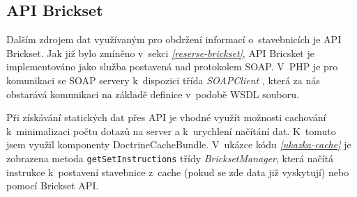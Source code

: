 
\subsection{API Brickset}
Dalším zdrojem dat využívaným pro obdržení informací o~stavebnicích je API Brickset. Jak již bylo zmíněno v~sekci \emph{\ref{reserse-brickset}}, API Bricsket je implementováno jako služba postavená nad protokolem \gls{SOAP}. V~PHP je pro komunikaci se SOAP servery k~dispozici třída \textit{SOAPClient} \autocite{soapclient}, která za nás obstarává komunikaci na základě definice v~podobě \gls{WSDL} souboru. 

Při získávání statických dat přes API je vhodné využít možnosti cachování k~minimalizaci počtu dotazů na server a k~urychlení načítání dat. K~tomuto jsem využil komponenty DoctrineCacheBundle. V~ukázce kódu \emph{\ref{ukazka-cache}} je zobrazena metoda \texttt{getSetInstructions} třídy \textit{BricksetManager}, která načítá instrukce k~postavení stavebnice z~cache (pokud se zde data již vyskytují) nebo pomocí Brickset API. 

